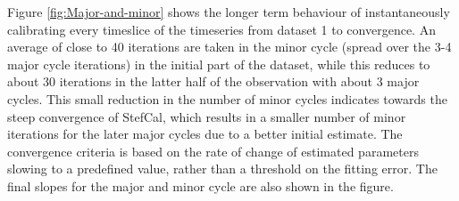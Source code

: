 \documentclass{aa}
\begin{document}
Figure   \ref{fig:Major-and-minor}   shows   the   longer  term   behaviour   of
instantaneously calibrating every timeslice of  the timeseries from dataset 1 to
convergence. An average  of close to 40 iterations are taken  in the minor cycle
(spread over the 3-4 major cycle iterations) in the initial part of the dataset,
while this reduces to about 30  iterations in the latter half of the observation
with about  3 major cycles. This small  reduction in the number  of minor cycles
indicates towards the  steep convergence of StefCal, which  results in a smaller
number of  minor iterations for the later  major cycles due to  a better initial
estimate. The convergence  criteria is based on the rate  of change of estimated
parameters slowing to a predefined value, rather than a threshold on the fitting
error. The  final slopes for  the major  and minor cycle  are also shown  in the
figure.
\end{document}
